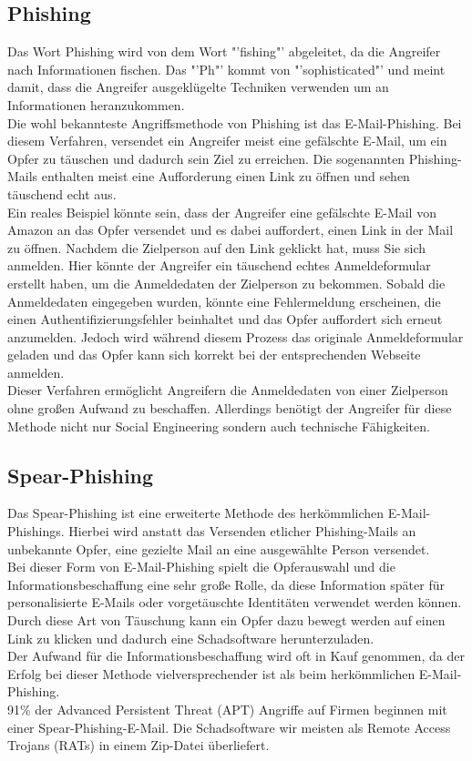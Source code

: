 		\subsection{Phishing}
		Das Wort Phishing wird von dem Wort "'fishing"' abgeleitet, da die Angreifer nach Informationen fischen. Das "'Ph"' kommt von "'sophisticated"' und meint damit, dass die Angreifer ausgeklügelte Techniken verwenden um an Informationen heranzukommen.\cite{PhishingExposed}\\
		Die wohl bekannteste Angriffsmethode von Phishing ist das E-Mail-Phishing. Bei diesem Verfahren, versendet ein Angreifer meist eine gefälschte E-Mail, um ein Opfer zu täuschen und dadurch sein Ziel zu erreichen. Die sogenannten Phishing-Mails enthalten meist eine Aufforderung einen Link zu öffnen und sehen täuschend echt aus.\\
		Ein reales Beispiel könnte sein, dass der Angreifer eine gefälschte E-Mail von Amazon an das Opfer versendet und es dabei auffordert, einen Link in der Mail zu öffnen. Nachdem die Zielperson auf den Link geklickt hat, muss Sie sich anmelden. Hier könnte der Angreifer ein täuschend echtes Anmeldeformular erstellt haben, um die Anmeldedaten der Zielperson zu bekommen. Sobald die Anmeldedaten eingegeben wurden, könnte eine Fehlermeldung erscheinen, die einen Authentifizierungsfehler beinhaltet und das Opfer auffordert sich erneut anzumelden. Jedoch wird während diesem Prozess das originale Anmeldeformular geladen und das Opfer kann sich korrekt bei der entsprechenden Webseite anmelden. \\
		Dieser Verfahren ermöglicht Angreifern die Anmeldedaten von einer Zielperson ohne großen Aufwand zu beschaffen. Allerdings benötigt der Angreifer für diese Methode nicht nur Social Engineering sondern auch technische Fähigkeiten.\cite{PhishingDarkWaters}
		
		\subsection{Spear-Phishing}
		Das Spear-Phishing ist eine erweiterte Methode des herkömmlichen E-Mail-Phishings. Hierbei wird anstatt das Versenden etlicher Phishing-Mails an unbekannte Opfer, eine gezielte Mail an eine ausgewählte Person versendet.\cite{SpearPhishingPaper}\\
		Bei dieser Form von E-Mail-Phishing spielt die Opferauswahl und die Informationsbeschaffung eine sehr große Rolle, da diese Information später für personalisierte E-Mails oder vorgetäuschte Identitäten verwendet werden können. Durch diese Art von Täuschung kann ein Opfer dazu bewegt werden auf einen Link zu klicken und dadurch eine Schadsoftware herunterzuladen.\cite{SpearPhishingPaper} \\
		Der Aufwand für die Informationsbeschaffung wird oft in Kauf genommen, da der Erfolg bei dieser Methode vielversprechender ist als beim herkömmlichen E-Mail-Phishing.\\
		91\% der Advanced Persistent Threat (APT) Angriffe auf Firmen beginnen mit einer Spear-Phishing-E-Mail. Die Schadsoftware wir meisten als Remote Access Trojans (RATs) in einem Zip-Datei überliefert.\cite{SpearPhishing}


